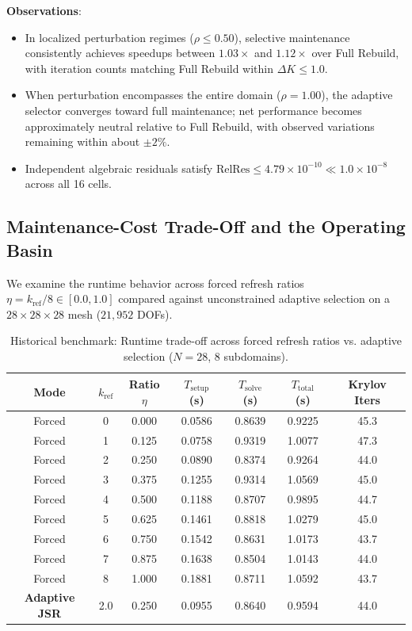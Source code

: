 \documentclass[preprint,12pt,3p]{elsarticle}
\begin{document}
\textbf{Observations}:
\begin{itemize}
    \item In localized perturbation regimes ($\rho \le 0.50$), selective maintenance consistently achieves speedups between $1.03\times$ and $1.12\times$ over Full Rebuild, with iteration counts matching Full Rebuild within $\Delta K \le 1.0$.
    \item When perturbation encompasses the entire domain ($\rho = 1.00$), the adaptive selector converges toward full maintenance; net performance becomes approximately neutral relative to Full Rebuild, with observed variations remaining within about $\pm 2\%$.
    \item Independent algebraic residuals satisfy $\text{RelRes} \le 4.79 \times 10^{-10} \ll 1.0 \times 10^{-8}$ across all 16 cells.
\end{itemize}

\subsection{Maintenance-Cost Trade-Off and the Operating Basin}
\label{subsec:res_tradeoff}
We examine the runtime behavior across forced refresh ratios $\eta = k_{\text{ref}}/8 \in [0.0, 1.0]$ compared against unconstrained adaptive selection on a $28 \times 28 \times 28$ mesh ($21,952$ DOFs).

\begin{table}[htbp]
\centering
\small
\caption{Historical benchmark: Runtime trade-off across forced refresh ratios vs. adaptive selection ($N=28$, 8 subdomains).}
\label{tab:pillar2_tradeoff}
\begin{tabular}{ccccccc}
\toprule
Mode & $k_{\text{ref}}$ & Ratio $\eta$ & $T_{\text{setup}}$ (s) & $T_{\text{solve}}$ (s) & $T_{\text{total}}$ (s) & Krylov Iters \\
\midrule
Forced & 0 & 0.000 & 0.0586 & 0.8639 & 0.9225 & 45.3 \\
Forced & 1 & 0.125 & 0.0758 & 0.9319 & 1.0077 & 47.3 \\
Forced & 2 & 0.250 & 0.0890 & 0.8374 & 0.9264 & 44.0 \\
Forced & 3 & 0.375 & 0.1255 & 0.9314 & 1.0569 & 45.0 \\
Forced & 4 & 0.500 & 0.1188 & 0.8707 & 0.9895 & 44.7 \\
Forced & 5 & 0.625 & 0.1461 & 0.8818 & 1.0279 & 45.0 \\
Forced & 6 & 0.750 & 0.1542 & 0.8631 & 1.0173 & 43.7 \\
Forced & 7 & 0.875 & 0.1638 & 0.8504 & 1.0143 & 44.0 \\
Forced & 8 & 1.000 & 0.1881 & 0.8711 & 1.0592 & 43.7 \\
\midrule
\textbf{Adaptive JSR} & 2.0 & 0.250 & 0.0955 & 0.8640 & 0.9594 & 44.0 \\
\bottomrule
\end{tabular}
\end{table}
\end{document}
